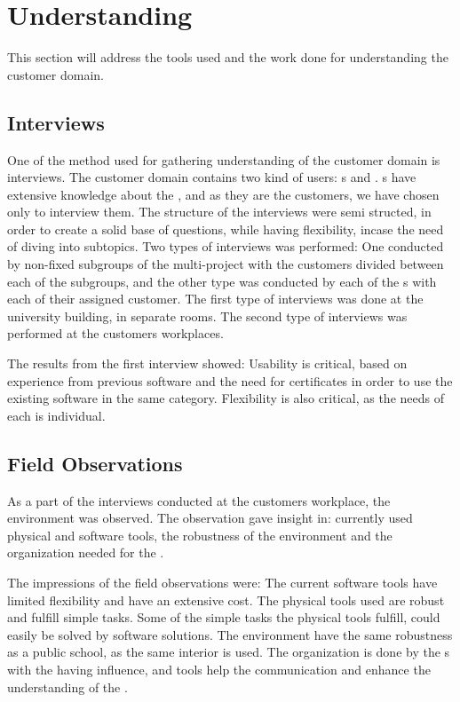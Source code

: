 \section{Understanding}
This section will address the tools used and the work done for understanding the customer domain.

\subsection{Interviews}
One of the method used for gathering understanding of the customer domain is interviews. 
The customer domain contains two kind of users: \guardian[c]s and \autists[].
\guardian[c]s have extensive knowledge about the \autists[], and as they are the customers, we have chosen only to interview them.
The structure of the interviews were semi structed, in order to create a solid base of questions, while having flexibility, incase the need of diving into subtopics. 
Two types of interviews was performed: One conducted by non-fixed subgroups of the multi-project with the customers divided between each of the subgroups, and the other type was conducted by each of the \localgroup{}s with each of their assigned customer. 
The first type of interviews was done at the university building, in separate rooms. 
The second type of interviews was performed at the customers workplaces. 

The results from the first interview showed: Usability is critical, based on experience from previous software and the need for certificates in order to use the existing software in the same category. Flexibility is also critical, as the needs of each \autist[] is individual.

\subsection{Field Observations}
As a part of the interviews conducted at the customers workplace, the environment was observed. The observation gave insight in: currently used physical and software tools, the robustness of the environment and the organization needed for the \autists[].

The impressions of the field observations were: The current software tools have limited flexibility and have an extensive cost. The physical tools used are robust and fulfill simple tasks. Some of the simple tasks the physical tools fulfill, could easily be solved by software solutions. The environment have the same robustness as a public school, as the same interior is used. The organization is done by the \guardian[]s with the \autists[] having influence, and tools help the communication and enhance the understanding of the \autists[].

